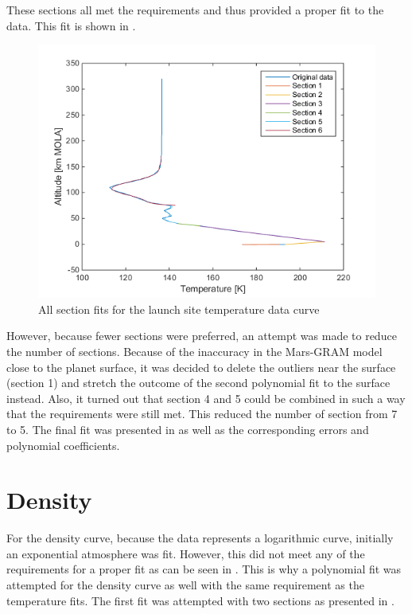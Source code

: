 These sections all met the requirements and thus provided a proper fit to the data. This fit is shown in .

\begin{figure}[H]
\centering
\includegraphics[width=0.6 \textwidth]{figures/software/completePolyFitTempSplit7.png}
\caption{All section fits for the launch site temperature data curve}
\label{fig:completePolyFitTempSplit7}
\end{figure}

However, because fewer sections were preferred, an attempt was made to reduce the number of sections. Because of the inaccuracy in the Mars-\ac{GRAM} model close to the planet surface, it was decided to delete the outliers near the surface (section 1) and stretch the outcome of the second polynomial fit to the surface instead. Also, it turned out that section 4 and 5 could be combined in such a way that the requirements were still met. This reduced the number of section from 7 to 5. The final fit was presented in  as well as the corresponding errors and polynomial coefficients.                                                                                      




\section{Density}
\label{appsec:denFit}
For the density curve, because the data represents a logarithmic curve, initially an exponential atmosphere was fit. However, this did not meet any of the requirements for a proper fit as can be seen in . This is why a polynomial fit was attempted for the density curve as well with the same requirement as the temperature fits. The first fit was attempted with two sections as presented in . 

